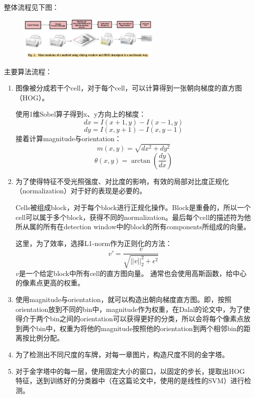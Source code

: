 整体流程见下图：
\begin{figure}[H]
    \centering 
    \includegraphics[width=0.618\textwidth]{image/2_2_1.jpg}    
    \label{logic}
\end{figure}
主要算法流程：
\begin{enumerate}
\item 
图像被分成若干个cell，对于每个cell，可以计算得到一张朝向梯度的直方图（HOG）。

使用1维Sobel算子得到x、y方向上的梯度：
$$dx=I(x+1,y)-I(x-1,y)$$
$$dy=I(x,y+1)-I(x,y-1)$$
接着计算magnitude与orientation：
$$m(x,y)=\sqrt{dx^2+dy^2}$$
$$\theta(x,y)=\arctan(\frac{dy}{dx})$$
\item
为了使得特征不受光照强度、对比度的影响，有效的局部对比度正规化（normalization）对于好的表现是必要的。

Cells被组成block，对于每个block进行正规化操作。Block是重叠的，所以一个cell可以属于多个block，获得不同的normalization。最后每个cell的描述符为他所从属的所有在detection window中的block的所有components所组成的向量。

这里，为了效率，选择L1-norm作为正则化的方法：
$$v'=\frac{v}{\sqrt{||v||^2_2+\epsilon^2}}$$
$v$是一个给定block中所有cell的直方图向量。
通常也会使用高斯函数，给中心的像素点更高的权重。
\item
使用magnitude与orientation，就可以构造出朝向梯度直方图。即，按照orientation放到不同的bin中，magnitude作为权重，在Dalal的论文中，为了使得介于两个bin之间的orientation可以获得更好的分类，所以会将每个像素点放到两个bin中，权重为将他的magnitude按照他的orientation到两个相邻bin的距离按比例分配。
\item
为了检测出不同尺度的车牌，对每一章图片，构造尺度不同的金字塔。
\item
对于金字塔中的每一层，使用固定大小的窗口，以固定的步长，提取出HOG特征，送到训练好的分类器中（在这篇论文中，使用的是线性的SVM）进行检测。
\end{enumerate}
